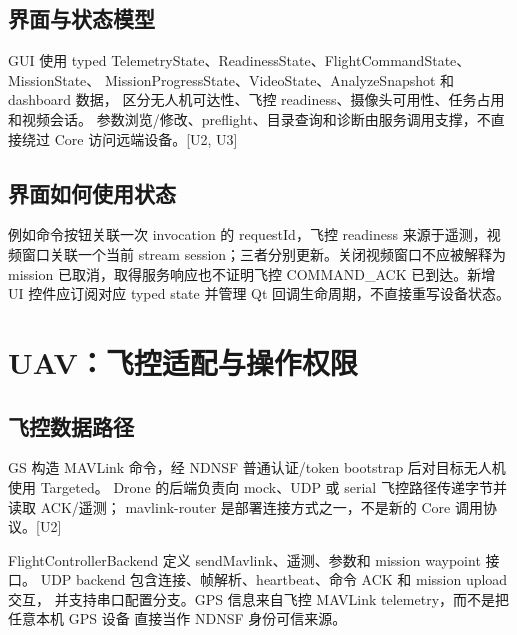 \subsection{界面与状态模型}
GUI 使用 typed TelemetryState、ReadinessState、FlightCommandState、MissionState、
MissionProgressState、VideoState、AnalyzeSnapshot 和 dashboard 数据，
区分无人机可达性、飞控 readiness、摄像头可用性、任务占用和视频会话。
参数浏览/修改、preflight、目录查询和诊断由服务调用支撑，不直接绕过 Core 访问远端设备。[U2, U3]



\subsection{界面如何使用状态}
例如命令按钮关联一次 invocation 的 requestId，飞控 readiness 来源于遥测，视频窗口关联一个当前 stream session；三者分别更新。关闭视频窗口不应被解释为 mission 已取消，取得服务响应也不证明飞控 COMMAND\_ACK 已到达。新增 UI 控件应订阅对应 typed state 并管理 Qt 回调生命周期，不直接重写设备状态。

\newpage

\section{UAV：飞控适配与操作权限}
\subsection{飞控数据路径}
GS 构造 MAVLink 命令，经 NDNSF 普通认证/token bootstrap 后对目标无人机使用 Targeted。
Drone 的后端负责向 mock、UDP 或 serial 飞控路径传递字节并读取 ACK/遥测；
mavlink-router 是部署连接方式之一，不是新的 Core 调用协议。[U2]

FlightControllerBackend 定义 sendMavlink、遥测、参数和 mission waypoint 接口。
UDP backend 包含连接、帧解析、heartbeat、命令 ACK 和 mission upload 交互，
并支持串口配置分支。GPS 信息来自飞控 MAVLink telemetry，而不是把任意本机 GPS 设备
直接当作 NDNSF 身份可信来源。

